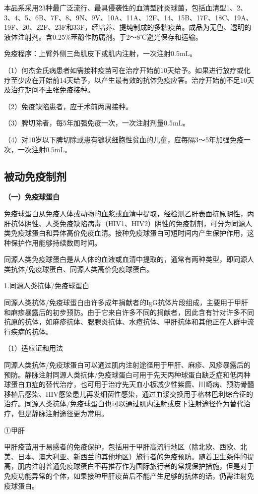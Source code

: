 本品系采用23种最广泛流行、最具侵袭性的血清型肺炎球菌，包括血清型1、2、3、4、5、6B、7F、8、9N、9V、10A、11A、12F、14、15B、17F、18C、19A、19F、20、22F、23F和33F，经培养、提纯制成的多糖疫苗。成品为无色、透明的液体注射剂。含0.25\%苯酚作防腐剂。于2～8℃避光保存和运输。

免疫程序：上臂外侧三角肌皮下或肌内注射，一次注射0.5mL。

（1）何杰金氏病患者如需接种疫苗可在治疗开始前10天给予。如果进行放疗或化疗至少应在开始前14天给予，以产生最有效的抗体免疫应答。治疗开始前不足10天及治疗期间不主张免疫接种。

（2）免疫缺陷患者，应于术前两周接种。

（3）脾切除者，每5年加强免疫一次，一次注射剂量0.5mL。

（4）对10岁以下脾切除或患有镰状细胞性贫血的儿童，应每隔3～5年加强免疫一次，一次注射0.5mL。


\subsection{被动免疫制剂}

\textbf{（一）免疫球蛋白}

免疫球蛋白从免疫人体或动物的血浆或血清中提取，经检测乙肝表面抗原阴性，丙肝抗体阴性、人类免疫缺陷病毒（HIV1、HIV2）阴性的免疫制剂，可分为同源人类免疫球蛋白和异体高价免疫血清。接种免疫球蛋白可短时间内产生保护作用，这种保护作用能够持续数周时间。

同源人类免疫球蛋白是从人体的血液或血清中提取的，通常有两种类型，即同源人类抗体/免疫球蛋白、同源人类高价免疫球蛋白。

1.同源人类抗体/免疫球蛋白

同源人类抗体/免疫球蛋白由许多成年捐献者的IgG抗体片段组成，主要用于甲肝和麻疹暴露后的初步预防。由于它来自许多不同的捐献者，因此含有针对许多不同抗原的抗体，如麻疹抗体、腮腺炎抗体、水痘抗体、甲肝抗体和其他正在人群中流行疾病的抗体。

（1）适应证和用法

同源人类抗体/免疫球蛋白可以通过肌内注射途径用于甲肝、麻疹、风疹暴露后的预防。静脉注射同源人类抗体/免疫球蛋白可用于先天丙种球蛋白缺乏症和低丙种球蛋白血症的替代治疗，也可用于治疗先天血小板减少性紫癜、川崎病、预防骨髓移植后感染、HIV感染患儿再发细菌性感染，通过血浆交换用于格林巴利综合征的治疗。同源人类抗体/免疫球蛋白也可以通过肌内注射或皮下注射途径作为替代治疗，但是静脉注射途径更为常用。

①甲肝

甲肝疫苗用于易感者的免疫保护，包括用于甲肝高流行地区（除北欧、西欧、北美、日本、澳大利亚、新西兰的其他地区）旅行者的免疫预防。随着卫生条件的提高，肌内注射普通免疫球蛋白不再推荐作为国际旅行者的常规保护措施，但是对于免疫功能异常的个体，如果接种甲肝疫苗后不能产生足够的抗体的话，仍需注射免疫球蛋白。

